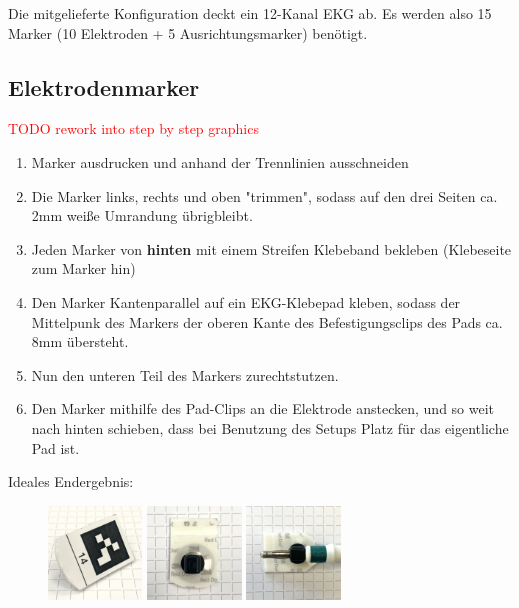 \documentclass[a4paper, 10pt]{article}
\newcommand{\warn}[1]{\textcolor{red}{#1}}
\begin{document}
Die mitgelieferte Konfiguration deckt ein 12-Kanal EKG ab. Es werden also 15 Marker (10 Elektroden + 5 Ausrichtungsmarker) benötigt.

\subsection{Elektrodenmarker}
\label{ssec:electrode-markers}
\warn{TODO rework into step by step graphics}
\begin{enumerate}
    \item Marker ausdrucken und anhand der Trennlinien ausschneiden
    \item Die Marker links, rechts und oben "trimmen", sodass auf den drei Seiten ca. 2mm weiße Umrandung übrigbleibt.
    \item Jeden Marker von \textbf{hinten} mit einem Streifen Klebeband bekleben (Klebeseite zum Marker hin)
    \item Den Marker Kantenparallel auf ein EKG-Klebepad kleben, sodass der Mittelpunk des Markers der oberen Kante des Befestigungsclips des Pads ca. 8mm übersteht.
    \item Nun den unteren Teil des Markers zurechtstutzen.
    \item Den Marker mithilfe des Pad-Clips an die Elektrode anstecken, und so weit nach hinten schieben, dass bei Benutzung des Setups Platz für das eigentliche Pad ist.
\end{enumerate}

Ideales Endergebnis:
\begin{figure}[H]
    \centering
    \includegraphics[width=2.5cm]{marker-front.png}
    \hspace*{5mm}
    \includegraphics[width=2.5cm]{marker-back.png}
    \hspace*{5mm}
    \includegraphics[width=2.5cm]{marker-attatched.png}
\end{figure}
\end{document}
